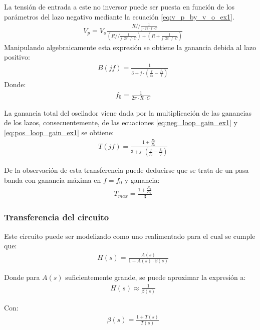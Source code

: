 La tensión de entrada a este no inversor puede ser puesta en función de los parámetros del lazo negativo mediante la ecuación \ref{eq:v_p_by_v_o_ex1}.
\begin{align}
    & V_p = V_o \frac{R // \frac{1}{j \cdot 2\pi \cdot f \cdot C}}{\left( R // \frac{1}{j \cdot 2\pi \cdot f \cdot C} \right) + \left( R + \frac{1}{j \cdot 2\pi \cdot f \cdot C}\right)}
    \label{eq:v_p_by_v_o_ex1}
\end{align}
Manipulando algebraicamente esta expresión se obtiene la ganancia debida al lazo positivo:
\begin{align}
    & B(jf) = \frac{1}{3 + j \cdot \left(\frac{f}{f_0} - \frac{f_0}{f}\right)}
    \label{eq:pos_loop_gain_ex1}
\end{align}
Donde:
\begin{align}
    & f_0 = \frac{1}{2\pi \cdot R \cdot C}
    \label{eq:osc_freq_ex1}
\end{align}

La ganancia total del oscilador viene dada por la multiplicación de las ganancias de los lazos, consecuentemente, de las ecuaciones \ref{eq:neg_loop_gain_ex1} y \ref{eq:pos_loop_gain_ex1}
se obtiene:
\begin{align}
    & T(jf) = \frac{1 + \frac{R_2}{R_1}}{3 + j \cdot \left(\frac{f}{f_0} - \frac{f_0}{f}\right)}
    \label{eq:total_gain_ex1}
\end{align}

De la observación de esta transferencia puede deducirse que se trata de un pasa banda con ganancia máxima en $f = f_0$ y ganancia:
\begin{align}
    & T_{max} = \frac{1 + \frac{R_2}{R_1}}{3}
    \label{eq:max_gain_ex1}
\end{align}


\subsubsection{Transferencia del circuito}
Este circuito puede ser modelizado como uno realimentado para el cual se cumple que:
\begin{align*}
    & H(s) = \frac{A(s)}{1 + A(s) \cdot \beta(s)}
\end{align*}

Donde para $A(s)$ suficientemente grande, se puede aproximar la expresión a:
\begin{align*}
    & H(s) \approx \frac{1}{\beta(s)}
\end{align*}

Con:
\begin{align*}
    & \beta(s) = \frac{1 + T(s)}{T(s)}
\end{align*}

